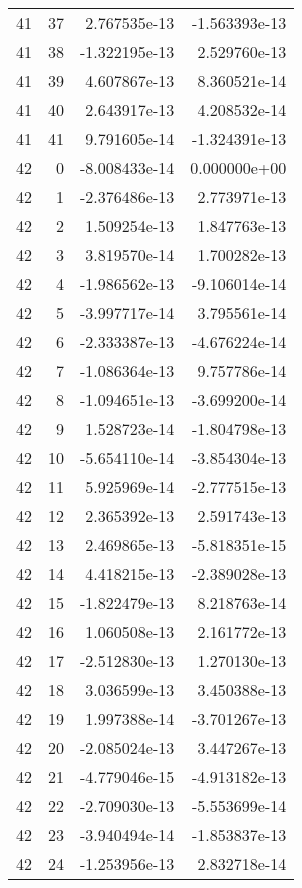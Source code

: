 \begin{tabular}{rrrr}
  41 &   37 &  2.767535e-13 & -1.563393e-13 \\
  41 &   38 & -1.322195e-13 &  2.529760e-13 \\
  41 &   39 &  4.607867e-13 &  8.360521e-14 \\
  41 &   40 &  2.643917e-13 &  4.208532e-14 \\
  41 &   41 &  9.791605e-14 & -1.324391e-13 \\
  42 &    0 & -8.008433e-14 &  0.000000e+00 \\
  42 &    1 & -2.376486e-13 &  2.773971e-13 \\
  42 &    2 &  1.509254e-13 &  1.847763e-13 \\
  42 &    3 &  3.819570e-14 &  1.700282e-13 \\
  42 &    4 & -1.986562e-13 & -9.106014e-14 \\
  42 &    5 & -3.997717e-14 &  3.795561e-14 \\
  42 &    6 & -2.333387e-13 & -4.676224e-14 \\
  42 &    7 & -1.086364e-13 &  9.757786e-14 \\
  42 &    8 & -1.094651e-13 & -3.699200e-14 \\
  42 &    9 &  1.528723e-14 & -1.804798e-13 \\
  42 &   10 & -5.654110e-14 & -3.854304e-13 \\
  42 &   11 &  5.925969e-14 & -2.777515e-13 \\
  42 &   12 &  2.365392e-13 &  2.591743e-13 \\
  42 &   13 &  2.469865e-13 & -5.818351e-15 \\
  42 &   14 &  4.418215e-13 & -2.389028e-13 \\
  42 &   15 & -1.822479e-13 &  8.218763e-14 \\
  42 &   16 &  1.060508e-13 &  2.161772e-13 \\
  42 &   17 & -2.512830e-13 &  1.270130e-13 \\
  42 &   18 &  3.036599e-13 &  3.450388e-13 \\
  42 &   19 &  1.997388e-14 & -3.701267e-13 \\
  42 &   20 & -2.085024e-13 &  3.447267e-13 \\
  42 &   21 & -4.779046e-15 & -4.913182e-13 \\
  42 &   22 & -2.709030e-13 & -5.553699e-14 \\
  42 &   23 & -3.940494e-14 & -1.853837e-13 \\
  42 &   24 & -1.253956e-13 &  2.832718e-14 \\

\end{tabular}
